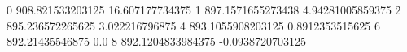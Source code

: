 0 908.821533203125 16.607177734375
1 897.1571655273438 4.94281005859375
2 895.236572265625 3.022216796875
4 893.1055908203125 0.8912353515625
6 892.21435546875 0.0
8 892.1204833984375 -0.0938720703125
